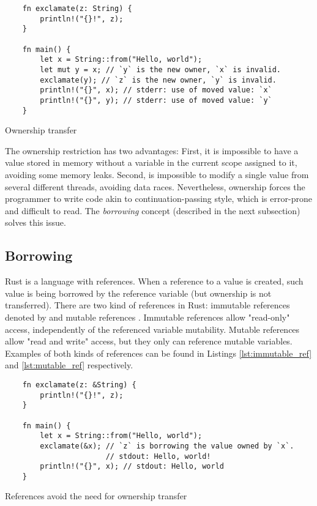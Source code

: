 \begin{listing}[h]
	\begin{verbatim}
    fn exclamate(z: String) {
        println!("{}!", z);
    }

    fn main() {
        let x = String::from("Hello, world");
        let mut y = x; // `y` is the new owner, `x` is invalid.
        exclamate(y); // `z` is the new owner, `y` is invalid.
        println!("{}", x); // stderr: use of moved value: `x`
        println!("{}", y); // stderr: use of moved value: `y`
    }
	\end{verbatim}
  \caption{Ownership transfer}
  \label{lst:ownership}
\end{listing}

The ownership restriction has two advantages: First, it is impossible to have a
value stored in memory without a variable in the current scope assigned to it,
avoiding some memory leaks. Second, is impossible to modify a single value from
several different threads, avoiding data races. Nevertheless, ownership forces
the programmer to write code akin to continuation-passing style, which is
error-prone and difficult to read. The \textit{borrowing} concept (described in
the next subsection) solves this issue.

\subsection{Borrowing}

Rust is a language with references. When a reference to a value is created,
such value is being borrowed by the reference variable (but ownership is not
transferred). There are two kind of references in Rust: immutable references
denoted by  and mutable references . Immutable
references allow "read-only" access, independently of the referenced variable
mutability. Mutable references allow "read and write" access, but they only can
reference mutable variables. Examples of both kinds of references can be found
in Listings \ref{lst:immutable_ref} and \ref{lst:mutable_ref} respectively.

\begin{listing}[h]
	\begin{verbatim}
    fn exclamate(z: &String) {
        println!("{}!", z);
    }

    fn main() {
        let x = String::from("Hello, world");
        exclamate(&x); // `z` is borrowing the value owned by `x`.
                       // stdout: Hello, world! 
        println!("{}", x); // stdout: Hello, world
    }
	\end{verbatim}
  \caption{References avoid the need for ownership transfer}
  \label{lst:immutable_ref}
\end{listing}

